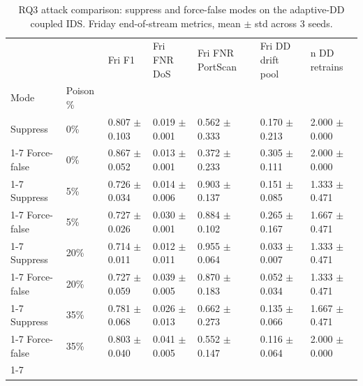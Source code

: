 \begin{table}
\caption{RQ3 attack comparison: suppress and force-false modes on the adaptive-DD coupled IDS. Friday end-of-stream metrics, mean $\pm$ std across 3 seeds.}
\label{tab:rq3-attack-comparison}
\begin{tabular}{lllllll}
\toprule
 &  & Fri F1 & Fri FNR DoS & Fri FNR PortScan & Fri DD drift pool & n DD retrains \\
Mode & Poison \% &  &  &  &  &  \\
\midrule
Suppress & 0\% & 0.807 $\pm$ 0.103 & 0.019 $\pm$ 0.001 & 0.562 $\pm$ 0.333 & 0.170 $\pm$ 0.213 & 2.000 $\pm$ 0.000 \\
\cline{1-7}
Force-false & 0\% & 0.867 $\pm$ 0.052 & 0.013 $\pm$ 0.001 & 0.372 $\pm$ 0.233 & 0.305 $\pm$ 0.111 & 2.000 $\pm$ 0.000 \\
\cline{1-7}
Suppress & 5\% & 0.726 $\pm$ 0.034 & 0.014 $\pm$ 0.006 & 0.903 $\pm$ 0.137 & 0.151 $\pm$ 0.085 & 1.333 $\pm$ 0.471 \\
\cline{1-7}
Force-false & 5\% & 0.727 $\pm$ 0.026 & 0.030 $\pm$ 0.001 & 0.884 $\pm$ 0.102 & 0.265 $\pm$ 0.167 & 1.667 $\pm$ 0.471 \\
\cline{1-7}
Suppress & 20\% & 0.714 $\pm$ 0.011 & 0.012 $\pm$ 0.011 & 0.955 $\pm$ 0.064 & 0.033 $\pm$ 0.007 & 1.333 $\pm$ 0.471 \\
\cline{1-7}
Force-false & 20\% & 0.727 $\pm$ 0.059 & 0.039 $\pm$ 0.005 & 0.870 $\pm$ 0.183 & 0.052 $\pm$ 0.034 & 1.333 $\pm$ 0.471 \\
\cline{1-7}
Suppress & 35\% & 0.781 $\pm$ 0.068 & 0.026 $\pm$ 0.013 & 0.662 $\pm$ 0.273 & 0.135 $\pm$ 0.066 & 1.667 $\pm$ 0.471 \\
\cline{1-7}
Force-false & 35\% & 0.803 $\pm$ 0.040 & 0.041 $\pm$ 0.005 & 0.552 $\pm$ 0.147 & 0.116 $\pm$ 0.064 & 2.000 $\pm$ 0.000 \\
\cline{1-7}
\bottomrule
\end{tabular}
\end{table}
